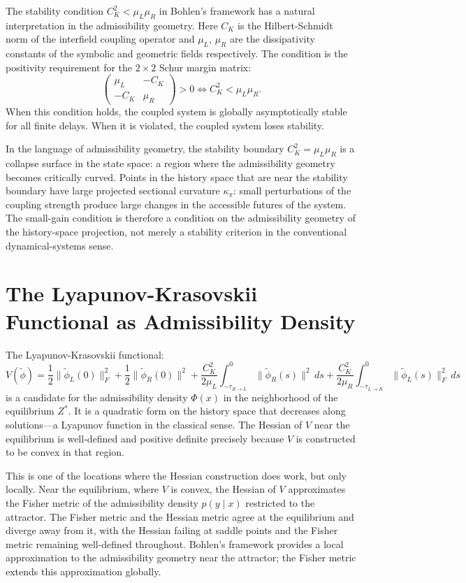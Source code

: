 \documentclass[12pt, oneside]{book}
\theoremstyle{plain-flyxion}
\theoremstyle{definition-flyxion}
\newcommand{\Phifield}{\Phi}
\newcommand{\kpi}{\kappa_{\pi}}
\begin{document}
The stability condition $C_K^2 < \mu_L\mu_R$ in Bohlen's framework has a natural
interpretation in the admissibility geometry. Here $C_K$ is the Hilbert-Schmidt norm of
the interfield coupling operator and $\mu_L$, $\mu_R$ are the dissipativity constants of
the symbolic and geometric fields respectively. The condition is the positivity requirement
for the $2\times 2$ Schur margin matrix:
\[
\begin{pmatrix} \mu_L & -C_K \\ -C_K & \mu_R \end{pmatrix} > 0
\iff C_K^2 < \mu_L\mu_R.
\]
When this condition holds, the coupled system is globally asymptotically stable for all
finite delays. When it is violated, the coupled system loses stability.

In the language of admissibility geometry, the stability boundary $C_K^2 = \mu_L\mu_R$
is a collapse surface in the state space: a region where the admissibility geometry
becomes critically curved. Points in the history space that are near the stability
boundary have large projected sectional curvature $\kpi$: small perturbations of the
coupling strength produce large changes in the accessible futures of the system. The
small-gain condition is therefore a condition on the admissibility geometry of the
history-space projection, not merely a stability criterion in the conventional
dynamical-systems sense.

\section{The Lyapunov-Krasovskii Functional as Admissibility Density}

The Lyapunov-Krasovskii functional:
\begin{equation}\label{eq:lkf}
V(\tilde\phi) = \frac{1}{2}\|\tilde\phi_L(0)\|_F^2
  + \frac{1}{2}\|\tilde\phi_R(0)\|^2
  + \frac{C_K^2}{2\mu_L}\int_{-\tau_{R\to L}}^0 \|\tilde\phi_R(s)\|^2\,ds
  + \frac{C_K^2}{2\mu_R}\int_{-\tau_{L\to R}}^0 \|\tilde\phi_L(s)\|_F^2\,ds
\end{equation}
is a candidate for the admissibility density $\Phifield(x)$ in the neighborhood of the
equilibrium $Z^*$. It is a quadratic form on the history space that decreases along
solutions---a Lyapunov function in the classical sense. The Hessian of $V$ near the
equilibrium is well-defined and positive definite precisely because $V$ is constructed to
be convex in that region.

This is one of the locations where the Hessian construction does work, but only locally.
Near the equilibrium, where $V$ is convex, the Hessian of $V$ approximates the Fisher
metric of the admissibility density $p(y\mid x)$ restricted to the attractor. The Fisher
metric and the Hessian metric agree at the equilibrium and diverge away from it, with the
Hessian failing at saddle points and the Fisher metric remaining well-defined throughout.
Bohlen's framework provides a local approximation to the admissibility geometry near the
attractor; the Fisher metric extends this approximation globally.
\end{document}
